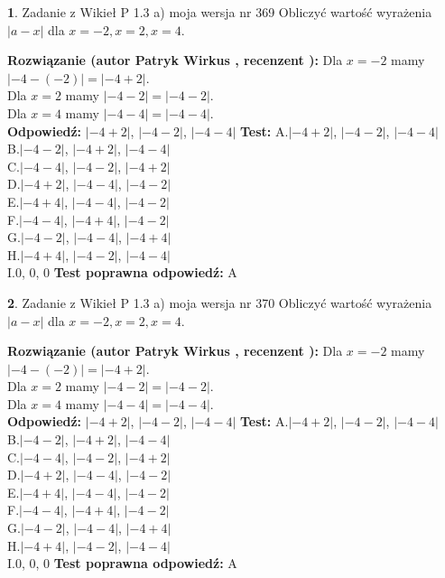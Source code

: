 \documentclass[12pt, a4paper]{article}
\theoremstyle{definition} %
\newtheorem{zad}{}
\newcommand{\zadStart}[1]{\begin{zad}#1\newline}
\newcommand{\zadStop}{\end{zad}}
\newcommand{\rozwStart}[2]{\noindent \textbf{Rozwiązanie (autor #1 , recenzent #2): }\newline}
\newcommand{\rozwStop}{\newline}
\newcommand{\odpStart}{\noindent \textbf{Odpowiedź:}\newline}
\newcommand{\odpStop}{\newline}
\newcommand{\testStart}{\noindent \textbf{Test:}\newline}
\newcommand{\testStop}{\newline}
\newcommand{\kluczStart}{\noindent \textbf{Test poprawna odpowiedź:}\newline}
\newcommand{\kluczStop}{\newline}
\begin{document}
\zadStart{Zadanie z Wikieł P 1.3 a) moja wersja nr 369}
Obliczyć wartość wyrażenia $|a - x|$ dla $x=-2,x=2,x=4$.
\zadStop
\rozwStart{Patryk Wirkus}{}
Dla $x = -2$ mamy $|-4 - (-2)| = |-4 + 2|$.\\
Dla $x = 2$ mamy $|-4 - 2| = |-4 - 2|$.\\
Dla $x = 4$ mamy $|-4 - 4| = |-4 - 4|$.\\
\rozwStop
\odpStart
$|-4 + 2|$, $|-4 - 2|$, $|-4 - 4|$
\odpStop
\testStart
A.$|-4 + 2|$, $|-4 - 2|$, $|-4 - 4|$\\
B.$|-4 - 2|$, $|-4 + 2|$, $|-4 - 4|$\\
C.$|-4 - 4|$, $|-4 - 2|$, $|-4 + 2|$\\
D.$|-4 + 2|$, $|-4 - 4|$, $|-4 - 2|$\\
E.$|-4 + 4|$, $|-4 - 4|$, $|-4 - 2|$\\
F.$|-4 - 4|$, $|-4 + 4|$, $|-4 - 2|$\\
G.$|-4 - 2|$, $|-4 - 4|$, $|-4 + 4|$\\
H.$|-4 + 4|$, $|-4 - 2|$, $|-4 - 4|$\\
I.$0$, $0$, $0$
\testStop
\kluczStart
A
\kluczStop



\zadStart{Zadanie z Wikieł P 1.3 a) moja wersja nr 370}
Obliczyć wartość wyrażenia $|a - x|$ dla $x=-2,x=2,x=4$.
\zadStop
\rozwStart{Patryk Wirkus}{}
Dla $x = -2$ mamy $|-4 - (-2)| = |-4 + 2|$.\\
Dla $x = 2$ mamy $|-4 - 2| = |-4 - 2|$.\\
Dla $x = 4$ mamy $|-4 - 4| = |-4 - 4|$.\\
\rozwStop
\odpStart
$|-4 + 2|$, $|-4 - 2|$, $|-4 - 4|$
\odpStop
\testStart
A.$|-4 + 2|$, $|-4 - 2|$, $|-4 - 4|$\\
B.$|-4 - 2|$, $|-4 + 2|$, $|-4 - 4|$\\
C.$|-4 - 4|$, $|-4 - 2|$, $|-4 + 2|$\\
D.$|-4 + 2|$, $|-4 - 4|$, $|-4 - 2|$\\
E.$|-4 + 4|$, $|-4 - 4|$, $|-4 - 2|$\\
F.$|-4 - 4|$, $|-4 + 4|$, $|-4 - 2|$\\
G.$|-4 - 2|$, $|-4 - 4|$, $|-4 + 4|$\\
H.$|-4 + 4|$, $|-4 - 2|$, $|-4 - 4|$\\
I.$0$, $0$, $0$
\testStop
\kluczStart
A
\kluczStop
\end{document}
